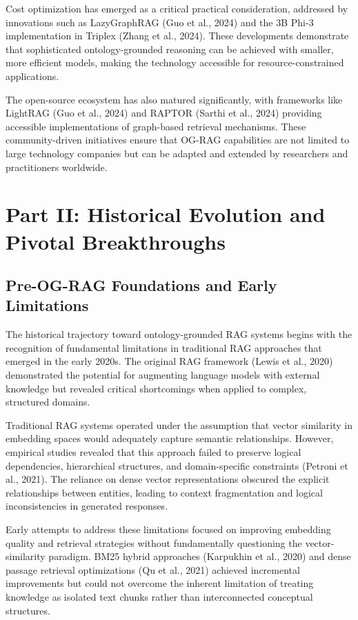 \documentclass[12pt]{report}
\begin{document}
Cost optimization has emerged as a critical practical consideration, addressed by innovations such as LazyGraphRAG (Guo et al., 2024) and the 3B Phi-3 implementation in Triplex (Zhang et al., 2024). These developments demonstrate that sophisticated ontology-grounded reasoning can be achieved with smaller, more efficient models, making the technology accessible for resource-constrained applications.

The open-source ecosystem has also matured significantly, with frameworks like LightRAG (Guo et al., 2024) and RAPTOR (Sarthi et al., 2024) providing accessible implementations of graph-based retrieval mechanisms. These community-driven initiatives ensure that OG-RAG capabilities are not limited to large technology companies but can be adapted and extended by researchers and practitioners worldwide.

\section{Part II: Historical Evolution and Pivotal Breakthroughs}

\subsection{Pre-OG-RAG Foundations and Early Limitations}

The historical trajectory toward ontology-grounded RAG systems begins with the recognition of fundamental limitations in traditional RAG approaches that emerged in the early 2020s. The original RAG framework (Lewis et al., 2020) demonstrated the potential for augmenting language models with external knowledge but revealed critical shortcomings when applied to complex, structured domains.

Traditional RAG systems operated under the assumption that vector similarity in embedding spaces would adequately capture semantic relationships. However, empirical studies revealed that this approach failed to preserve logical dependencies, hierarchical structures, and domain-specific constraints (Petroni et al., 2021). The reliance on dense vector representations obscured the explicit relationships between entities, leading to context fragmentation and logical inconsistencies in generated responses.

Early attempts to address these limitations focused on improving embedding quality and retrieval strategies without fundamentally questioning the vector-similarity paradigm. BM25 hybrid approaches (Karpukhin et al., 2020) and dense passage retrieval optimizations (Qu et al., 2021) achieved incremental improvements but could not overcome the inherent limitation of treating knowledge as isolated text chunks rather than interconnected conceptual structures.
\end{document}
